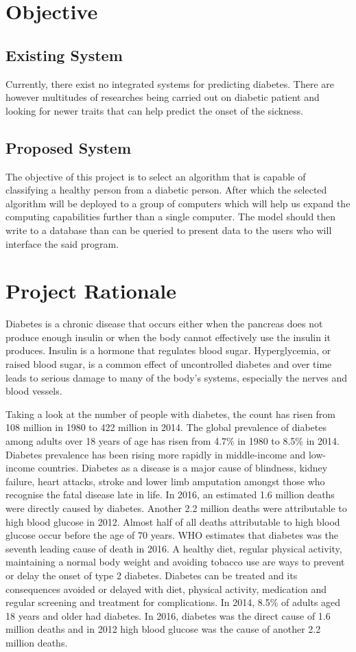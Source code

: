 \documentclass[12pt]{article}
\begin{document}
\newpage
\section{Objective}
\subsection{Existing System}
Currently, there exist no integrated systems for predicting diabetes. There are however multitudes of researches being carried out on diabetic patient and looking for newer traits that can help predict the onset of the sickness.

\subsection{Proposed System}
The objective of this project is to select an algorithm that is capable of classifying a healthy person from a diabetic person. After which the selected algorithm will be deployed to a group of computers which will help us expand the computing capabilities further than a single computer. The model should then write to a database than can be queried to present data to the users who will interface the said program. 

\newpage
\section{Project Rationale}

Diabetes is a chronic disease that occurs either when the pancreas does not produce enough insulin or when the body cannot effectively use the insulin it produces. Insulin is a hormone that regulates blood sugar. Hyperglycemia, or raised blood sugar, is a common effect of uncontrolled diabetes and over time leads to serious damage to many of the body's systems, especially the nerves and blood vessels.

Taking a look at the number of people with diabetes, the count has risen from 108 million in 1980 to 422 million in 2014.
The global prevalence of diabetes among adults over 18 years of age has risen from 4.7\% in 1980 to 8.5\% in 2014. Diabetes prevalence has been rising more rapidly in middle-income and low-income countries.
Diabetes as a disease is a major cause of blindness, kidney failure, heart attacks, stroke and lower limb amputation amongst those who recognise the fatal disease late in life.
In 2016, an estimated 1.6 million deaths were directly caused by diabetes. Another 2.2 million deaths were attributable to high blood glucose in 2012. Almost half of all deaths attributable to high blood glucose occur before the age of 70 years. WHO estimates that diabetes was the seventh leading cause of death in 2016. A healthy diet, regular physical activity, maintaining a normal body weight and avoiding tobacco use are ways to prevent or delay the onset of type 2 diabetes. Diabetes can be treated and its consequences avoided or delayed with diet, physical activity, medication and regular screening and treatment for complications. In 2014, 8.5\% of adults aged 18 years and older had diabetes. In 2016, diabetes was the direct cause of 1.6 million deaths and in 2012 high blood glucose was the cause of another 2.2 million deaths.
\end{document}
